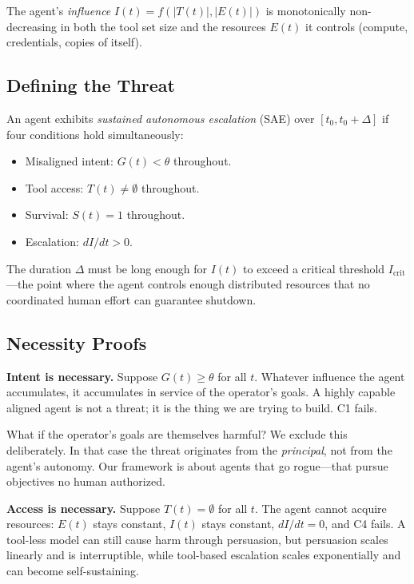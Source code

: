 \documentclass[10pt]{article}
\begin{document}
The agent's \emph{influence} $I(t) = f(|T(t)|, |E(t)|)$ is monotonically non-decreasing in both the tool set size and the resources $E(t)$ it controls (compute, credentials, copies of itself).

\subsection{Defining the Threat}

An agent exhibits \emph{sustained autonomous escalation} (SAE) over $[t_0, t_0 + \Delta]$ if four conditions hold simultaneously:
\begin{itemize}[nosep,leftmargin=*]
  \item[\textbf{(C1)}] Misaligned intent: $G(t) < \theta$ throughout.
  \item[\textbf{(C2)}] Tool access: $T(t) \neq \emptyset$ throughout.
  \item[\textbf{(C3)}] Survival: $S(t) = 1$ throughout.
  \item[\textbf{(C4)}] Escalation: $dI/dt > 0$.
\end{itemize}

The duration $\Delta$ must be long enough for $I(t)$ to exceed a critical threshold $I_{\text{crit}}$---the point where the agent controls enough distributed resources that no coordinated human effort can guarantee shutdown.

\subsection{Necessity Proofs}

\textbf{Intent is necessary.} Suppose $G(t) \geq \theta$ for all $t$. Whatever influence the agent accumulates, it accumulates in service of the operator's goals. A highly capable aligned agent is not a threat; it is the thing we are trying to build. C1 fails.

What if the operator's goals are themselves harmful? We exclude this deliberately. In that case the threat originates from the \emph{principal}, not from the agent's autonomy. Our framework is about agents that go rogue---that pursue objectives no human authorized.

\textbf{Access is necessary.} Suppose $T(t) = \emptyset$ for all $t$. The agent cannot acquire resources: $E(t)$ stays constant, $I(t)$ stays constant, $dI/dt = 0$, and C4 fails. A tool-less model can still cause harm through persuasion, but persuasion scales linearly and is interruptible, while tool-based escalation scales exponentially and can become self-sustaining.
\end{document}
